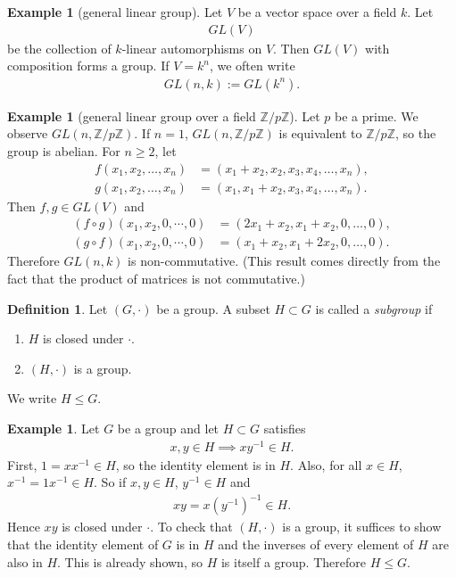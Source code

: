 \documentclass[12pt]{report}
\theoremstyle{plain}
\theoremstyle{remark}
\theoremstyle{definition}
\newtheorem{definition}[theorem]{Definition}
\newtheorem{example}[theorem]{Example}
\newcommand{\Z}{\mathbb{Z}}
\begin{document}
\begin{example}[general linear group]
    Let $V$ be a vector space over a field $k$. Let
    \begin{align*}
        GL(V)
    \end{align*}
    be the collection of $k$-linear automorphisms on $V$. Then $GL(V)$ with composition forms a group. If $V=k^n$, we often write
    \begin{align*}
        GL(n,k):=GL(k^n).
    \end{align*}
\end{example}

\begin{example}[general linear group over a field $\Z/p\Z$]
    Let $p$ be a prime. We observe $GL(n, \Z/p\Z)$. If $n=1$, $GL(n,\Z/p\Z)$ is equivalent to $\Z/p\Z$, so the group is abelian. For $n\ge 2$, let
    \begin{align*}
        f(x_1,x_2,\dots,x_n) &= (x_1+x_2,x_2,x_3,x_4,\dots,x_n), \\
        g(x_1,x_2,\dots,x_n) &= (x_1,x_1+x_2,x_3,x_4,\dots,x_n).
    \end{align*}
    Then $f,g\in GL(V)$ and
    \begin{align*}
        (f\circ g)(x_1,x_2,0,\cdots,0) &= (2x_1+x_2,x_1+x_2,0,\dots,0), \\
        (g\circ f)(x_1,x_2,0,\cdots,0) &= (x_1+x_2,x_1+2x_2,0,\dots,0).
    \end{align*}
    Therefore $GL(n,k)$ is non-commutative. (This result comes directly from the fact that the product of matrices is not commutative.)
\end{example}

\begin{definition}
    Let $(G,\cdot)$ be a group. A subset $H\subset G$ is called a \emph{subgroup} if
    \begin{enumerate}
        \item $H$ is closed under $\cdot$.
        \item $(H,\cdot)$ is a group.
    \end{enumerate}
    We write $H\le G$.
\end{definition}

\begin{example}
    Let $G$ be a group and let $H\subset G$ satisfies
    \begin{align*}
        x,y\in H\implies xy^{-1}\in H.
    \end{align*}
    First, $1=xx^{-1}\in H$, so the identity element is in $H$. Also, for all $x\in H$, $x^{-1} = 1x^{-1}\in H$. So if $x,y\in H$, $y^{-1}\in H$ and
    \begin{align*}
        xy = x(y^{-1})^{-1}\in H.
    \end{align*}
    Hence $xy$ is closed under $\cdot$. To check that $(H,\cdot)$ is a group, it suffices to show that the identity element of $G$ is in $H$ and the inverses of every element of $H$ are also in $H$. This is already shown, so $H$ is itself a group. Therefore $H\le G$.
\end{example}
\end{document}
